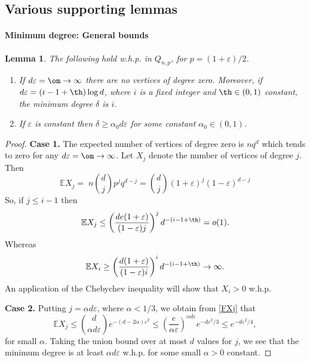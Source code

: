 \documentclass[12pt]{article}
\def\red{\color{red}}
\def\a{\alpha} \def\b{\beta} \def\d{\delta} \def\D{\Delta}
\def\e{\varepsilon} \def\f{\phi} \def\F{{\Phi}} \def\vp{\varphi} \def\g{\gamma}
\newtheorem{lemma}[theorem]{Lemma}
\newcommand{\bfrac}[2]{\left(\frac{#1}{#2}\right)}
\newcommand{\rai}{\rightarrow \infty}
\def\E{\mathbb{E}}
\newcommand{\ignore}[1]{}
\newcommand{\beq}[2]{\begin{equation}\label{#1}#2\end{equation}}
\begin{document}
\subsection{Various supporting lemmas} \label{VariousBits}


\paragraph{Minimum degree: General bounds}
\begin{lemma}\label{MinDeg}
The following hold w.h.p. in $Q_{n,p}$, for $p=(1+\e)/2$.
\begin{enumerate}%
\item \label{Part1} If $d\e=\om \rai$  there are no vertices of degree zero.
Moreover, if $d\e=(i-1 +\th) \log d$, where  $i$ is a fixed integer and $\th \in (0,1)$ constant, the minimum degree $\d$ is $i$.
\item \label{part4}If $\e$ is constant then $\d\ge \a_0 d\e$ for some constant $\a_0 \in (0,1)$.
\end{enumerate}
\end{lemma}
\begin{proof}
{\bf Case 1.} The expected number of vertices of degree zero is $n q^d$ which tends to zero for any $d\e=\om \rai$.
 Let $X_j$ denote the number of vertices of degree $j$. Then
\beq{FXj}{
\E X_j= \;n {d \choose j}p^jq^{d-j} = \binom{d}{j}(1+\e)^j(1-\e)^{d-j}
}
So, if $j\leq i-1$ then
\[
\E X_j\leq \bfrac{de(1+\e)}{(1-\e)j}^jd^{-(i-1+\th)}=o(1).
\]
Whereas
\[
\E X_i\geq \bfrac{d(1+\e)}{(1-\e)i}^id^{-(i-1+\th)}\to\infty.
\]
An application of the Chebychev inequality will show that $X_i>0$ w.h.p.

\ignore{
{\red {\bf Case 2.} Suppose that $d\e=\a\log^kd$. then if $j=\b\log^{k-1}d$ then
\[
\E X_j\leq \bfrac{de(1+\e)}{(1-\e)\b\log^{k-1}d} ^{\b\log^{k-1}d}e^{-\a\log^kd}=o(1),
\]
if $\a>\b$.

If $\a<\b$ then $\E X_j\to\infty$ and we can use Chebyshev.
}
}

{\bf Case 2.}
Putting $j=\a d\e$, where $\a<1/3$, we obtain from \eqref{FXj} that
\[
\E X_j\le \binom{d}{\a d\e}e^{-(d-2\a)\e^2}\leq \bfrac{e}{\a \e}^{\a d\e}e^{-d\e^2/3}\leq e^{-d\e^2/4},
\]
for small $\a$. Taking the union bound over at most $d$ values for $j$, we see that the minimum degree is at least $\a d\e $ w.h.p. for some small $\a>0$ constant.
\ignore{
On the other hand,
\[
\E X_j\geq \bfrac{1}{\a \e}^{\a d\e}(1+\e)^{\a d\e}(1-\e)^{(1-\a\e)d}\to\infty,
\]
if $\a\e$ is close to 1. Using Chebyshev we see that there are vertices of degree $\a\e d$, implying that the minimum degree satisfies 4.
}
\end{proof}
\end{document}
